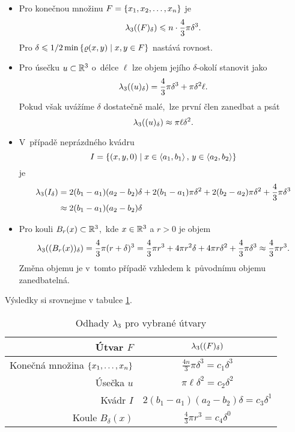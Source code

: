 \begin{itemize}
    \item Pro konečnou množinu $F=\left\{x_1,x_2,\ldots,x_n\right\}$ je
    \[\lambda_3((F)_\delta)\leqslant n\cdot\dfrac{4}{3}\pi\delta^3.\]
    Pro $\delta\leqslant1/2\min\left\{\varrho(x,y)\mid x,y\in F\right\}$ nastává rovnost.
    \item Pro úsečku $u\subset\mathbb{R}^3$ o~délce $\ell$ lze objem jejího $\delta$-okolí stanovit jako
    \[\lambda_3((u)_\delta)=\dfrac{4}{3}\pi \delta^3+\pi\delta^2\ell.\]
    Pokud však uvážíme $\delta$ dostatečně malé,~lze první člen zanedbat a psát
    \[\lambda_3((u)_\delta)\approx\pi\ell\delta^2.\]
    \item V~případě neprázdného kvádru
    \[I=\left\{(x,y,0)\mid x\in\langle a_1,b_1\rangle\,,\,y\in\langle a_2,b_2\rangle\right\}\]
    je
    \begin{align*}
        \lambda_3(I_\delta)&=2(b_1-a_1)(a_2-b_2)\delta+2(b_1-a_1)\pi\delta^2+2(b_2-a_2)\pi\delta^2+\dfrac{4}{3}\pi\delta^3\\
        &\approx 2(b_1-a_1)(a_2-b_2)\delta
    \end{align*}
    \item Pro kouli $B_r(x)\subset\mathbb{R}^3$,~kde $x\in\mathbb{R}^3$ a $r>0$ je objem
    \[\lambda_3((B_r(x))_\delta)=\dfrac{4}{3}\pi (r+\delta)^3=\dfrac{4}{3}\pi r^3+4\pi r^2\delta+4\pi r\delta^2+\dfrac{4}{3}\pi\delta^3\approx\dfrac{4}{3}\pi r^3.\]
    Změna objemu je v~tomto případě vzhledem k~původnímu objemu zanedbatelná.
\end{itemize}
Výsledky si srovnejme v tabulce \ref{table:odhady-lambda_3}.
\begin{table}[h]
    \centering
    \begin{tabular}{r|c}
    Útvar $F$                               & $\lambda_3((F)_\delta)$       \\\hline
    Konečná množina $\left\{x_1,\ldots,x_n\right\}$ & $\frac{4n}{3}\pi\delta^3=c_1\delta^3$   \\
    Úsečka $u$                             & $\pi\ell\delta^2=c_2\delta^2$           \\
    Kvádr $I$                              & $2(b_1-a_1)(a_2-b_2)\delta=c_3\delta^1$ \\
    Koule $B_\delta(x)$                    & $\frac{4}{3}\pi r^3=c_4\delta^0$      
    \end{tabular}
    \caption{Odhady $\lambda_3$ pro vybrané útvary}
    \label{table:odhady-lambda_3}
\end{table}
